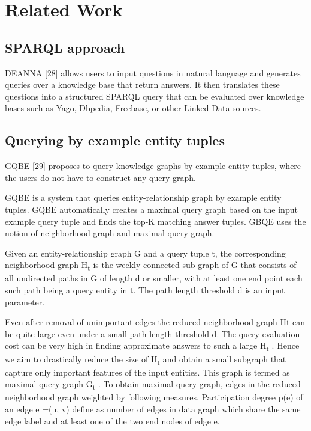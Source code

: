 \chapter{Related Work}


\section{SPARQL approach}
DEANNA [28] allows users to input questions in natural language and generates queries over a knowledge base that return answers. It then translates these questions into a structured SPARQL query that can be evaluated over knowledge bases such as Yago, Dbpedia, Freebase, or other Linked Data sources. 

\section{Querying by example entity tuples}
 GQBE [29] proposes to query knowledge graphs by example entity tuples, where the users do not have to construct any query graph. 
 
 GQBE is a system that queries entity-relationship graph by example entity tuples. GQBE automatically creates a maximal query graph based on the input example query tuple and finds the top-K matching answer tuples. GBQE uses the notion of neighborhood graph and maximal query graph.
 
Given an entity-relationship graph G and a query tuple t, the corresponding
neighborhood graph H\textsubscript{t} is the weekly connected sub graph of G that consists of all undirected paths in G of length d or smaller, with at least one end point each such path being a query entity in t. The path length threshold d is an input parameter.

Even after removal of unimportant edges the reduced neighborhood graph Ht
 can be
quite large even under a small path length threshold d. The query evaluation cost can be very
high in finding approximate answers to such a large H\textsubscript{t}
. Hence we aim to drastically reduce the
size of H\textsubscript{t}
 and obtain a small subgraph that capture only important features of the input entities.
This graph is termed as maximal query graph G\textsubscript{t}
.
To obtain maximal query graph, edges in the reduced neighborhood graph weighted by
following measures.
Participation degree p(e) of an edge e =(u, v) define as number of edges
in data graph which share the same edge label and at least one of the two end nodes of edge e.

